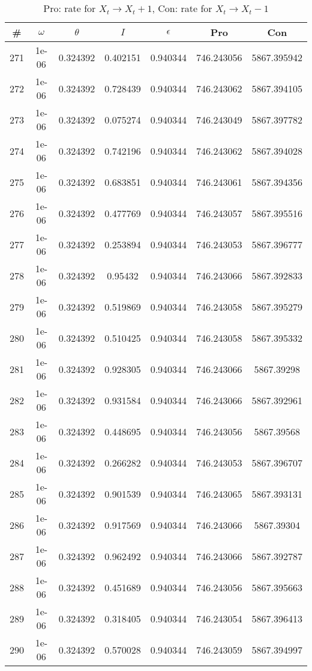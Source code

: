 \newpage
\begin{table}
\caption{Pro: rate for $X_t \rightarrow X_t + 1$, Con: rate for $X_t \rightarrow X_t - 1$}
\begin{tabular*}{\linewidth}{c|c|c|c|c|c|c}
\# & $\omega$ & $\theta$ & $I$ & $\epsilon$ & Pro & Con \\
\hline
271 & 1e-06 & 0.324392 & 0.402151 & 0.940344 & 746.243056 & 5867.395942\\
272 & 1e-06 & 0.324392 & 0.728439 & 0.940344 & 746.243062 & 5867.394105\\
273 & 1e-06 & 0.324392 & 0.075274 & 0.940344 & 746.243049 & 5867.397782\\
274 & 1e-06 & 0.324392 & 0.742196 & 0.940344 & 746.243062 & 5867.394028\\
275 & 1e-06 & 0.324392 & 0.683851 & 0.940344 & 746.243061 & 5867.394356\\
276 & 1e-06 & 0.324392 & 0.477769 & 0.940344 & 746.243057 & 5867.395516\\
277 & 1e-06 & 0.324392 & 0.253894 & 0.940344 & 746.243053 & 5867.396777\\
278 & 1e-06 & 0.324392 & 0.95432 & 0.940344 & 746.243066 & 5867.392833\\
279 & 1e-06 & 0.324392 & 0.519869 & 0.940344 & 746.243058 & 5867.395279\\
280 & 1e-06 & 0.324392 & 0.510425 & 0.940344 & 746.243058 & 5867.395332\\
281 & 1e-06 & 0.324392 & 0.928305 & 0.940344 & 746.243066 & 5867.39298\\
282 & 1e-06 & 0.324392 & 0.931584 & 0.940344 & 746.243066 & 5867.392961\\
283 & 1e-06 & 0.324392 & 0.448695 & 0.940344 & 746.243056 & 5867.39568\\
284 & 1e-06 & 0.324392 & 0.266282 & 0.940344 & 746.243053 & 5867.396707\\
285 & 1e-06 & 0.324392 & 0.901539 & 0.940344 & 746.243065 & 5867.393131\\
286 & 1e-06 & 0.324392 & 0.917569 & 0.940344 & 746.243066 & 5867.39304\\
287 & 1e-06 & 0.324392 & 0.962492 & 0.940344 & 746.243066 & 5867.392787\\
288 & 1e-06 & 0.324392 & 0.451689 & 0.940344 & 746.243056 & 5867.395663\\
289 & 1e-06 & 0.324392 & 0.318405 & 0.940344 & 746.243054 & 5867.396413\\
290 & 1e-06 & 0.324392 & 0.570028 & 0.940344 & 746.243059 & 5867.394997\\

\end{tabular*}
\end{table}
